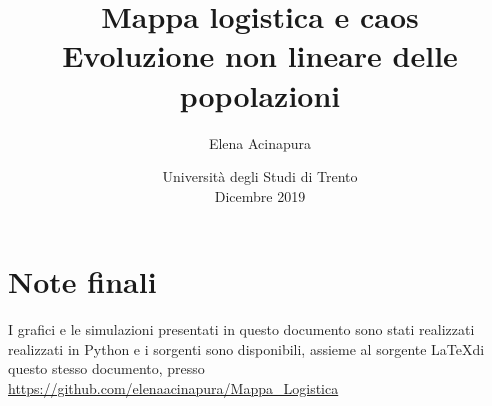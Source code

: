 \documentclass{article}
\title{\textbf{\LARGE Mappa logistica e caos}\\ {\Large Evoluzione non lineare delle popolazioni}}
\author{Elena Acinapura}
\date{{Università degli Studi di Trento} \\{Dicembre 2019}}
\theoremstyle{teorema}
\theoremstyle{definizione}
\begin{document}
\maketitle
\begin{minipage}{\linewidth}
\end{minipage}

\newpage
\tableofcontents
\newpage






\vspace{30pt}

\vspace{30pt}
\section*{Note finali}
I grafici e le simulazioni presentati in questo documento sono stati realizzati realizzati in Python e i sorgenti sono disponibili, assieme al sorgente \LaTeX di questo stesso documento, presso \url{https://github.com/elenaacinapura/Mappa_Logistica}
\vspace{30pt}
\end{document}
